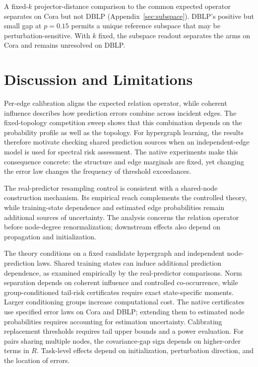 \documentclass[preprint,11pt]{elsarticle}
\let\paragraph\elsparagraph
\begin{document}
\paragraph{Secondary spectral readout.}
A fixed-$k$ projector-distance comparison to the common expected
operator separates on Cora but not DBLP
(Appendix~\ref{sec:subspace}). DBLP's positive but small gap at
$p=0.15$ permits a unique reference subspace that may be
perturbation-sensitive. With $k$ fixed, the subspace readout separates
the arms on Cora and remains unresolved on DBLP.

\section{Discussion and Limitations}\label{sec:limits}

Per-edge calibration aligns the expected relation operator, while
coherent influence describes how prediction errors combine across
incident edges. The fixed-topology competition sweep shows that this
combination depends on the probability profile as well as the topology.
For hypergraph learning, the results therefore motivate checking shared
prediction sources when an independent-edge model is used for spectral
risk assessment. The native experiments make this consequence concrete:
the structure and edge marginals are fixed, yet changing the error law
changes the frequency of threshold exceedances.

The real-predictor resampling control is consistent with a shared-node
construction mechanism. Its empirical reach complements the controlled
theory, while training-state dependence and estimated edge probabilities
remain additional sources of uncertainty. The analysis concerns the
relation operator before node-degree renormalization; downstream effects
also depend on propagation and initialization.

The theory conditions on a fixed candidate hypergraph and independent
node-prediction laws. Shared training states can induce additional
prediction dependence, as examined empirically by the real-predictor
comparisons. Norm separation depends on coherent influence and
controlled co-occurrence, while group-conditioned tail-risk
certificates require exact state-specific moments. Larger conditioning
groups increase computational cost. The native certificates use
specified error laws on Cora and DBLP; extending them to estimated node
probabilities requires accounting for estimation uncertainty.
Calibrating replacement thresholds requires tail upper bounds and a
power evaluation. For pairs sharing multiple nodes, the covariance-gap
sign depends on higher-order terms in $R$. Task-level effects depend on
initialization, perturbation direction, and the location of errors.
\end{document}
